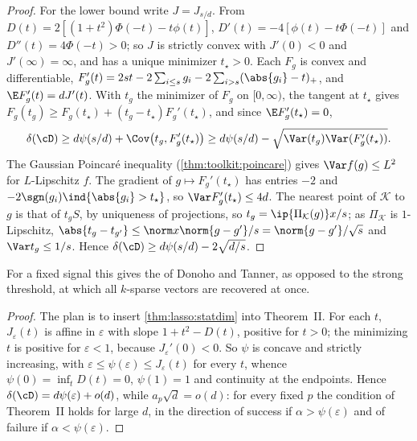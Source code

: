 \begin{refsection}
\begin{proof}
For the lower bound write $J=J_{s/d}$. From $D(t)=2[(1+t^2)\Phi(-t)-t\phi(t)]$, $D'(t)=-4[\phi(t)-t\Phi(-t)]$ and $D''(t)=4\Phi(-t)>0$; so $J$ is strictly convex with $J'(0)<0$ and $J'(\infty)=\infty$, and has a unique minimizer $t_\star>0$. Each $F_g$ is convex and differentiable, $F_g'(t)=2st-2\sum_{i\le s}g_i-2\sum_{i>s}(\abs{g_i}-t)_+$, and $\E F_g'(t)=dJ'(t)$. With $t_g$ the minimizer of $F_g$ on $[0,\infty)$, the tangent at $t_\star$ gives $F_g(t_g)\ge F_g(t_\star)+(t_g-t_\star)F_g'(t_\star)$, and since $\E F_g'(t_\star)=0$,
\[
\delta(\cD)\ge d\psi(s/d)+\Cov\bigl(t_g,F_g'(t_\star)\bigr)\ge d\psi(s/d)-\sqrt{\Var(t_g)\Var(F_g'(t_\star))}.
\]
The Gaussian Poincar\'e inequality (\cref{thm:toolkit:poincare}) gives $\Var f(g)\le L^2$ for $L$-Lipschitz $f$. The gradient of $g\mapsto F_g'(t_\star)$ has entries $-2$ and $-2\sgn(g_i)\ind\{\abs{g_i}>t_\star\}$, so $\Var F_g'(t_\star)\le4d$. The nearest point of $\mathcal K$ to $g$ is that of $t_gS$, by uniqueness of projections, so $t_g=\ip{\Pi_{\mathcal K}(g)}x/s$; as $\Pi_{\mathcal K}$ is $1$-Lipschitz, $\abs{t_g-t_{g'}}\le\norm x\norm{g-g'}/s=\norm{g-g'}/\sqrt s$ and $\Var t_g\le1/s$. Hence $\delta(\cD)\ge d\psi(s/d)-2\sqrt{d/s}$.
\end{proof}

For a fixed signal this gives the  of Donoho and Tanner, as opposed to the strong threshold, at which all $k$-sparse vectors are recovered at once.


\begin{proof}
The plan is to insert \cref{thm:lasso:statdim} into Theorem~II. For each $t$, $J_\varepsilon(t)$ is affine in $\varepsilon$ with slope $1+t^2-D(t)$, positive for $t>0$; the minimizing $t$ is positive for $\varepsilon<1$, because $J_\varepsilon'(0)<0$. So $\psi$ is concave and strictly increasing, with $\varepsilon\le\psi(\varepsilon)\le J_\varepsilon(t)$ for every $t$, whence $\psi(0)=\inf_tD(t)=0$, $\psi(1)=1$ and continuity at the endpoints. Hence $\delta(\cD)=d\psi(\varepsilon)+o(d)$, while $a_p\sqrt d=o(d)$: for every fixed $p$ the condition of Theorem~II holds for large $d$, in the direction of success if $\alpha>\psi(\varepsilon)$ and of failure if $\alpha<\psi(\varepsilon)$.
\end{proof}


\end{refsection}
